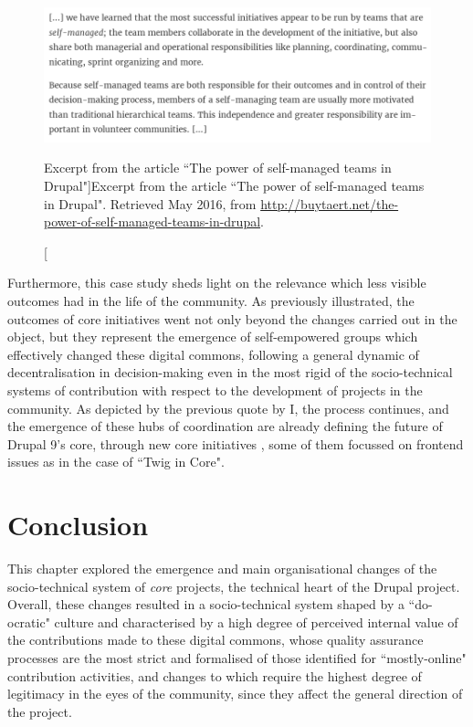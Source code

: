 \begin{figure}[H]
\centering
\includegraphics[width=\textwidth]{img/quotes_replacement/power_self_managed_teams.png}
\caption[Excerpt from the article ``The power of self-managed teams in Drupal"]{Excerpt from the article ``The power of self-managed teams in Drupal". Retrieved  May 2016, from \url{http://buytaert.net/the-power-of-self-managed-teams-in-drupal}.}
\label{power_self_managed_teams}
\end{figure}

Furthermore, this case study sheds light on the relevance which less visible outcomes had in the life of the community.  As previously illustrated, the outcomes of core initiatives went not only beyond the changes carried out in the object, but they represent the emergence of self-empowered groups which effectively changed these digital commons, following a general dynamic of decentralisation in decision-making even in the most rigid of the socio-technical systems of contribution with respect to the development of projects in the community. As depicted by the previous quote by I, the process continues, and the emergence of these hubs of coordination are already defining the future of Drupal 9's core, through new core initiatives \parencite{d8-new-initiatives:Online}, some of them \parencite{d8-new-theme-in-core:Online} focussed on frontend issues as in the case of ``Twig in Core".

\section{Conclusion}
\label{mosly-online-discussion}

This chapter explored the emergence and main organisational changes of the socio-technical system of \textit{core} projects, the technical heart of the Drupal project. Overall, these changes resulted in a socio-technical system shaped by a ``do-ocratic" culture and characterised by a high degree of perceived internal value of the contributions made to these digital commons, whose quality assurance processes are the most strict and formalised of those identified for ``mostly-online" contribution activities, and changes to which require the highest degree of legitimacy in the eyes of the community, since they affect the general direction of the project.

